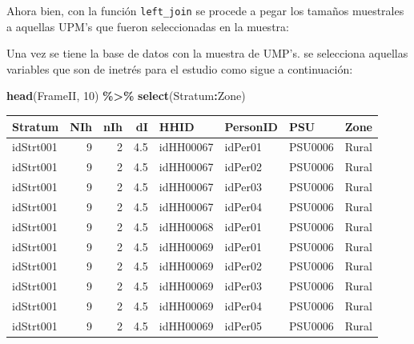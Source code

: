 \documentclass[
  12pt,
]{book}
\newenvironment{Shaded}{\begin{snugshade}}{\end{snugshade}}
\newcommand{\DecValTok}[1]{\textcolor[rgb]{0.00,0.00,0.81}{#1}}
\newcommand{\FunctionTok}[1]{\textcolor[rgb]{0.13,0.29,0.53}{\textbf{#1}}}
\newcommand{\NormalTok}[1]{#1}
\newcommand{\OtherTok}[1]{\textcolor[rgb]{0.56,0.35,0.01}{#1}}
\newcommand{\SpecialCharTok}[1]{\textcolor[rgb]{0.81,0.36,0.00}{\textbf{#1}}}
\begin{document}
\begin{Shaded}
\end{Shaded}

Ahora bien, con la función \texttt{left\_join} se procede a pegar los tamaños muestrales a aquellas UPM's que fueron seleccionadas en la muestra:

\begin{Shaded}
\end{Shaded}

Una vez se tiene la base de datos con la muestra de UMP's. se selecciona aquellas variables que son de inetrés para el estudio como sigue a continuación:

\begin{Shaded}
\begin{Highlighting}[]
\FunctionTok{head}\NormalTok{(FrameII, }\DecValTok{10}\NormalTok{) }\SpecialCharTok{\%\textgreater{}\%} \FunctionTok{select}\NormalTok{(Stratum}\SpecialCharTok{:}\NormalTok{Zone)}
\end{Highlighting}
\end{Shaded}

\begin{tabular}{l|r|r|r|l|l|l|l}
\hline
Stratum & NIh & nIh & dI & HHID & PersonID & PSU & Zone\\
\hline
idStrt001 & 9 & 2 & 4.5 & idHH00067 & idPer01 & PSU0006 & Rural\\
\hline
idStrt001 & 9 & 2 & 4.5 & idHH00067 & idPer02 & PSU0006 & Rural\\
\hline
idStrt001 & 9 & 2 & 4.5 & idHH00067 & idPer03 & PSU0006 & Rural\\
\hline
idStrt001 & 9 & 2 & 4.5 & idHH00067 & idPer04 & PSU0006 & Rural\\
\hline
idStrt001 & 9 & 2 & 4.5 & idHH00068 & idPer01 & PSU0006 & Rural\\
\hline
idStrt001 & 9 & 2 & 4.5 & idHH00069 & idPer01 & PSU0006 & Rural\\
\hline
idStrt001 & 9 & 2 & 4.5 & idHH00069 & idPer02 & PSU0006 & Rural\\
\hline
idStrt001 & 9 & 2 & 4.5 & idHH00069 & idPer03 & PSU0006 & Rural\\
\hline
idStrt001 & 9 & 2 & 4.5 & idHH00069 & idPer04 & PSU0006 & Rural\\
\hline
idStrt001 & 9 & 2 & 4.5 & idHH00069 & idPer05 & PSU0006 & Rural\\
\hline
\end{tabular}
\end{document}
